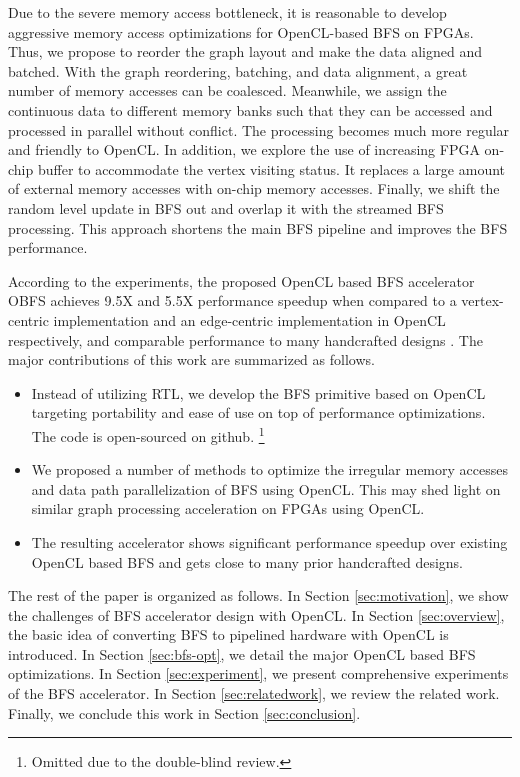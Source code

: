 Due to the severe memory access bottleneck, it is reasonable to develop 
aggressive memory access optimizations for OpenCL-based BFS on FPGAs. 
Thus, we propose to reorder the graph layout and make the data aligned and batched. 
With the graph reordering, batching, and data alignment, a great number of memory accesses 
can be coalesced. Meanwhile, we assign the continuous data to different 
memory banks such that they can be accessed and processed in parallel 
without conflict. The processing becomes much more regular and friendly to 
OpenCL. In addition, we explore the use of increasing FPGA on-chip buffer 
to accommodate the vertex visiting status. It replaces a large amount of 
external memory accesses with on-chip memory accesses. Finally, we shift the random 
level update in BFS out and overlap it with the streamed BFS 
processing. This approach shortens the main BFS pipeline 
and improves the BFS performance.

According to the experiments, the proposed OpenCL based BFS 
accelerator OBFS achieves 9.5X and 5.5X performance speedup when compared to 
a vertex-centric implementation \cite{gautier2016spector} and an edge-centric 
implementation \cite{chen_fpl2019} in OpenCL respectively, and comparable performance to many handcrafted 
designs \cite{dai2016fpgp, Dai2017foregraph, zhou2017accelerating}. The major 
contributions of this work are summarized as follows.
\begin{itemize}
    \item %
		Instead of utilizing RTL, we develop the BFS primitive based on OpenCL 
		targeting portability and ease of use on top of performance optimizations.
		The code is open-sourced on github. 
		\footnote{Omitted due to the double-blind review.}
    \item We proposed a number of methods to optimize the irregular
		memory accesses and data path parallelization of BFS using OpenCL. 
		This may shed light on similar graph processing acceleration on 
		FPGAs using OpenCL.
    \item The resulting accelerator shows significant performance speedup 
        over existing OpenCL based BFS and gets close to many prior handcrafted 
		designs.
\end{itemize}

The rest of the paper is organized as follows. In Section \ref{sec:motivation},  
we show the challenges of BFS accelerator design with OpenCL. In Section \ref{sec:overview}, 
the basic idea of converting BFS to pipelined hardware with OpenCL is introduced.
In Section \ref{sec:bfs-opt}, we detail the major OpenCL 
based BFS optimizations. In Section \ref{sec:experiment}, we present comprehensive experiments of the 
BFS accelerator. In Section \ref{sec:relatedwork}, we review the related work. Finally, we conclude 
this work in Section \ref{sec:conclusion}.

